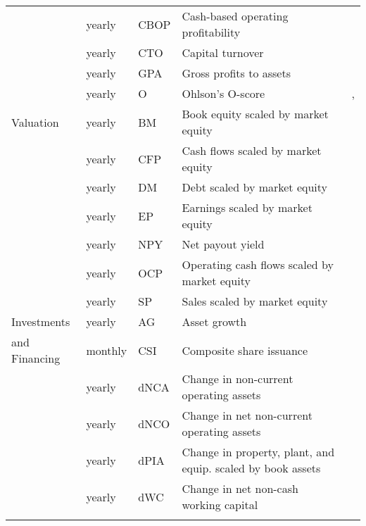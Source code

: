 \begin{landscape}
\begin{ThreePartTable}
\begin{center}
\begin{footnotesize}
\begin{longtabu}{l l l l l}
						  & yearly & CBOP & Cash-based operating profitability & \cite{ba/ge/li/ni/2016} \\
                        \rule{0pt}{3ex}
						  & yearly & CTO & Capital turnover  & \cite{ha/ba/1996} \\
                        \rule{0pt}{3ex}
						  & yearly & GPA & Gross profits to assets  & \cite{no/2013} \\
                        \rule{0pt}{3ex}
						  & yearly & O & Ohlson's O-score  & \cite{oh/1980}, \cite{di/1998} \\
						\hline 
						\rule{0pt}{3ex}
						Valuation & yearly & BM & Book equity scaled by market equity & \cite{da/fa/fr/2000} \\
						\rule{0pt}{3ex}
						 & yearly & CFP & Cash flows scaled by market equity & \cite{la/sh/vi/1994} \\
                      \rule{0pt}{3ex}
						 & yearly & DM & Debt scaled by market equity & \cite{bh/1988} \\
						 \rule{0pt}{3ex}
						 & yearly & EP & Earnings scaled by market equity & \cite{ba/1983} \\
						 \rule{0pt}{3ex}
						 & yearly & NPY & Net payout yield & \cite{bo/mi/ri/ro/2007} \\
						 \rule{0pt}{3ex}
						 & yearly & OCP & Operating cash flows scaled by market equity & \cite{de/ra/ve/2004} \\
						 \rule{0pt}{3ex}
						 & yearly & SP & Sales scaled by market equity & \cite{ba/mu/ra/1996} \\
						 \hline 
						 \rule{0pt}{3ex}
						Investments & yearly & AG & Asset growth & \cite{co/gu/sc/2008} \\
						  \rule{0pt}{3ex}
						  and Financing& monthly & CSI & Composite share issuance & \cite{da/ti/2006} \\
						\rule{0pt}{3ex}
                        & yearly & dNCA & Change in non-current operating assets & \cite{ri/sl/so/tu/2005} \\
						\rule{0pt}{3ex}
						& yearly & dNCO & Change in net non-current operating assets & \cite{ri/sl/so/tu/2005} \\
						\rule{0pt}{3ex}
						& yearly & dPIA & Change in property, plant, and equip. scaled by book assets & \cite{ly/su/zh/2008} \\
						\rule{0pt}{3ex}
						& yearly & dWC & Change in net non-cash working capital & \cite{ri/sl/so/tu/2005} \\
						\rule{0pt}{3ex}

\end{longtabu}
\end{footnotesize}
\end{center}
\end{ThreePartTable}
\end{landscape}
